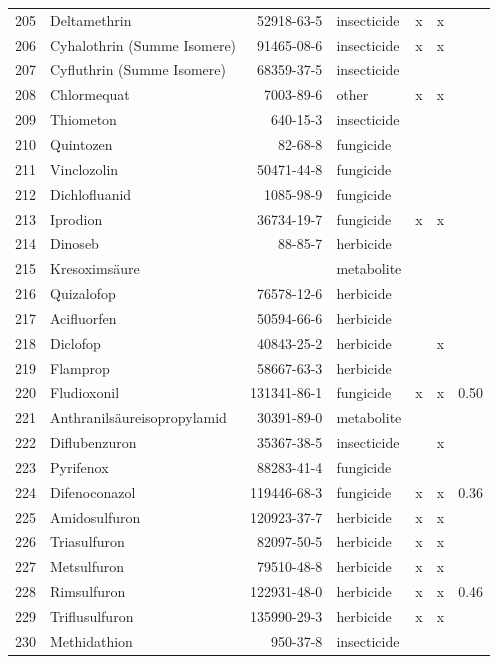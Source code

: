 \begin{longtable}{lp{3cm}rlp{0.5cm}p{0.5cm}p{1cm}}
  205 & Deltamethrin & 52918-63-5 & insecticide & x & x &  \\ 
  206 & Cyhalothrin (Summe Isomere) & 91465-08-6 & insecticide & x & x &  \\ 
  207 & Cyfluthrin (Summe Isomere) & 68359-37-5 & insecticide &  &  &  \\ 
  208 & Chlormequat & 7003-89-6 & other & x & x &  \\ 
  209 & Thiometon & 640-15-3 & insecticide &  &  &  \\ 
  210 & Quintozen & 82-68-8 & fungicide &  &  &  \\ 
  211 & Vinclozolin & 50471-44-8 & fungicide &  &  &  \\ 
  212 & Dichlofluanid & 1085-98-9 & fungicide &  &  &  \\ 
  213 & Iprodion & 36734-19-7 & fungicide & x & x &  \\ 
  214 & Dinoseb & 88-85-7 & herbicide &  &  &  \\ 
  215 & Kresoximsäure &  & metabolite &  &  &  \\ 
  216 & Quizalofop & 76578-12-6 & herbicide &  &  &  \\ 
  217 & Acifluorfen & 50594-66-6 & herbicide &  &  &  \\ 
  218 & Diclofop & 40843-25-2 & herbicide &  & x &  \\ 
  219 & Flamprop & 58667-63-3 & herbicide &  &  &  \\ 
  220 & Fludioxonil & 131341-86-1 & fungicide & x & x & 0.50 \\ 
  221 & Anthranilsäureisopropylamid & 30391-89-0 & metabolite &  &  &  \\ 
  222 & Diflubenzuron & 35367-38-5 & insecticide &  & x &  \\ 
  223 & Pyrifenox & 88283-41-4 & fungicide &  &  &  \\ 
  224 & Difenoconazol & 119446-68-3 & fungicide & x & x & 0.36 \\ 
  225 & Amidosulfuron & 120923-37-7 & herbicide & x & x &  \\ 
  226 & Triasulfuron & 82097-50-5 & herbicide & x & x &  \\ 
  227 & Metsulfuron & 79510-48-8 & herbicide & x & x &  \\ 
  228 & Rimsulfuron & 122931-48-0 & herbicide & x & x & 0.46 \\ 
  229 & Triflusulfuron & 135990-29-3 & herbicide & x & x &  \\ 
  230 & Methidathion & 950-37-8 & insecticide &  &  &  \\ 

\end{longtable}

